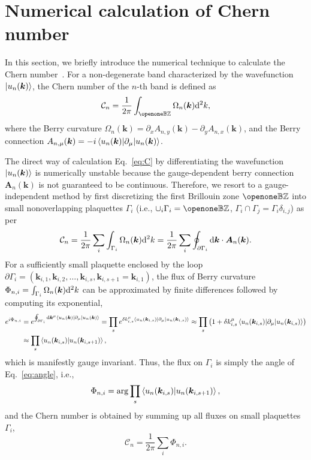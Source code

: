 \documentclass[aps,prl,onecolumn,superscriptaddress,longbibliography]{revtex4-2}
\begin{document}
{
\section{Numerical calculation of Chern number}
In this section, we briefly introduce the numerical technique to calculate the Chern number~\cite{wu2020quantum,fukui2005chern}. For a non-degenerate band characterized by the wavefunction $\ket{u_n(\bm{k})}$, the Chern number of the $n$-th band is defined as 
\begin{equation}\label{eq:C}
    \mathcal{C}_n=\frac{1}{2\pi}\int_{\openone\mathbb{BZ}} \Omega_n(\bm{k}) \differential^2 k,
\end{equation}
where the Berry curvature $\Omega_n(\bm{k})=\partial_x A_{n,y}(\bm{k})-\partial_y A_{n,x}(\bm{k})$, and the Berry connection $A_{n,\mu} (\bm{k})= -i \matrixelement{u_n(\bm{k})}{\partial_\mu}{u_n(\bm{k})} $. 

The direct way of calculation Eq.~\eqref{eq:C} by differentiating the wavefunction $\ket{u_n(\bm{k})}$ is numerically unstable because the gauge-dependent berry connection $\bm{A}_{n}(\bm{k})$ is not guaranteed to be continuous. Therefore, we resort to a gauge-independent method by first discretizing the first Brillouin zone $\openone\mathbb{BZ}$ into small nonoverlapping plaquettes $\Gamma_i$ (i.e., $\cup_i \Gamma_i = \openone\mathbb{BZ}$, $\Gamma_i \cap \Gamma_j=\Gamma_i \delta_{i,j}$) as per
\begin{equation}
    \mathcal{C}_n=\frac{1}{2\pi}\sum_{i}\int_{\Gamma_i}  \Omega_n(\bm{k}) \differential^2 k=\frac{1}{2\pi}\sum_{i} \oint_{\partial\Gamma_i} \differential \bm{k} \cdot \bm{A}_n(\bm{k}).
\end{equation}
For a sufficiently small plaquette enclosed by the loop $\partial \Gamma_i = \left( \bm{k}_{i,1},\bm{k}_{i,2}, \dots, \bm{k}_{i,s}, \bm{k}_{i,s+1}=\bm{k}_{i,1} \right) $, the flux of Berry curvature $\Phi_{n,i}=\int_{\Gamma_i}  \Omega_n(\bm{k}) \differential^2 k$ can be approximated by finite differences followed by computing its exponential,
\begin{equation}\label{eq:angle}
\begin{aligned}
    e^{i \Phi_{n,i}}&=e^{ \oint_{\partial \Gamma_i} \differential \bm{k}^\mu \matrixelement{u_n(\bm{k})}{\partial_\mu}{u_n(\bm{k})}}=\prod_{s} e^{\delta k_{i,s}^\mu \matrixelement{u_n(\bm{k}_{i,s})}{\partial_\mu}{u_n(\bm{k}_{i,s})}}\approx \prod_{s} \left( 1+  \delta k_{i,s}^\mu \matrixelement{u_n(\bm{k}_{i,s})}{\partial_\mu}{u_n(\bm{k}_{i,s})} \right) \\
    & \approx \prod_s \braket{u_n(\bm{k}_{i,s})}{u_n(\bm{k}_{i,s+1})},
\end{aligned}
\end{equation}
which is manifestly gauge invariant. Thus, the flux on $\Gamma_i$ is simply the angle of Eq.~\eqref{eq:angle}, i.e.,
\begin{equation}
    \Phi_{n,i}=\arg \prod_s \braket{u_n(\bm{k}_{i,s})}{u_n(\bm{k}_{i,s+1})},
\end{equation}
and the Chern number is obtained by summing up all fluxes on small plaquettes $\Gamma_i$,
\begin{equation}
    \mathcal{C}_n=\frac{1}{2\pi}\sum_i \Phi_{n,i}.
\end{equation}

}
\end{document}
